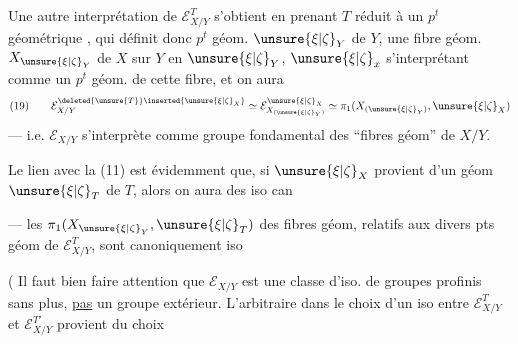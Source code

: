 
Une autre interprétation de $\mathcal E_{X/Y}^T$ s'obtient en prenant $T$ réduit à un $p^t$ géométrique , qui définit donc  $p^t$ géom. $\unsure{\xi|\zeta}_Y$ de $Y$, une fibre géom. $X_{\unsure{\xi|\zeta}_Y}$ de $X$ sur $Y$ en $\unsure{\xi|\zeta}_Y$, $\unsure{\xi|\zeta}_x$ s'interprétant comme un $p^t$ géom. de cette fibre, et on aura
\[
(19)\qquad \mathcal E_{X/Y}^{\deleted{\unsure{T}}\inserted{\unsure{\xi|\zeta}_X}}\simeq\mathcal E_{X_{(\unsure{\xi|\zeta}_Y)}}^{\unsure{\xi|\zeta}_X}\simeq\pi_1(X_{(\unsure{\xi|\zeta}_Y)},\unsure{\xi|\zeta}_X)
\]
--- i.e. $\mathcal E_{X/Y}$ s'interprète comme groupe fondamental des ``fibres géom'' de $X/Y$.



Le lien avec la  (11) est évidemment que, si $\unsure{\xi|\zeta}_X$ provient d'un  géom $\unsure{\xi|\zeta}_T$ de $T$, alors on aura des iso can


 --- les $\pi_1(X_{\unsure{\xi|\zeta}_Y},\unsure{\xi|\zeta}_T)$ des fibres géom, relatifs aux divers pts géom de $\mathcal E_{X/Y}^T$, sont canoniquement iso 

( Il faut bien faire attention que $\mathcal E_{X/Y}$  est une classe d'iso. de groupes profinis sans plus, \uline{pas} un groupe extérieur. L'arbitraire dans le choix d'un iso entre $\mathcal E_{X/Y}^T$ et $\mathcal E_{X/Y}^{T'}$ provient du choix



